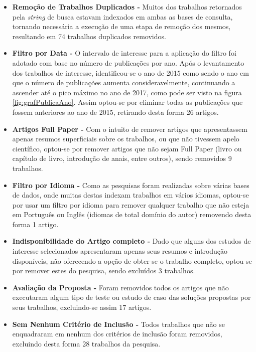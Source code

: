 \documentclass[ti,table]{texufpel} %
\begin{document}
\begin{itemize} 

\item  \textbf{Remoção de Trabalhos Duplicados - } Muitos dos trabalhos retornados pela \textit{string} de busca estavam indexados em ambas as bases de consulta, tornando necessária a execução de uma etapa de remoção dos mesmos, resultando em 74 trabalhos duplicados removidos. 

  

\item  \textbf{Filtro por Data - } O intervalo de interesse para a aplicação do filtro foi adotado com base no número de publicações por ano. Após o levantamento dos trabalhos de interesse, identificou-se o ano de 2015 como sendo o ano em que o número de publicações aumenta consideravelmente, continuando a ascender até o pico máximo no ano de 2017, como pode ser visto na figura \ref{fig:grafPublicaAno}. Assim optou-se por eliminar todas as publicações que fossem anteriores ao ano de 2015, retirando desta forma 26 artigos.     

  

\item  \textbf{Artigos Full Paper - } Com o intuito de remover artigos que apresentassem apenas resumos superficiais sobre os trabalhos, ou que não tivessem apelo científico, optou-se por remover artigos que não sejam Full Paper (livro ou capítulo de livro, introdução de anais, entre outros), sendo removidos 9 trabalhos. 

  

\item  \textbf{Filtro por Idioma - } Como as pesquisas foram realizadas sobre várias bases de dados, onde muitas destas indexam trabalhos em vários idiomas, optou-se por usar um filtro por idioma para remover qualquer trabalho que não esteja em Português ou Inglês (idiomas de total domínio do autor) removendo desta forma 1 artigo. 

  

\item  \textbf{Indisponibilidade do Artigo completo - } Dado que alguns dos estudos de interesse selecionados apresentaram apenas seus resumos e introdução disponíveis, não oferecendo a opção de obter-se o trabalho completo, optou-se por remover estes do pesquisa, sendo excluídos 3 trabalhos. 

  

\item  \textbf{Avaliação da Proposta - } Foram removidos todos os artigos que não executaram algum tipo de teste ou estudo de caso das soluções propostas por seus trabalhos, excluindo-se assim 17 artigos. 

  

\item  \textbf{Sem Nenhum Critério de Inclusão - } Todos trabalhos que não  se enquadraram em nenhum dos critérios de inclusão foram removidos, excluindo desta forma 28 trabalhos da pesquisa. 

     

  

\end{itemize} 
\end{document}
